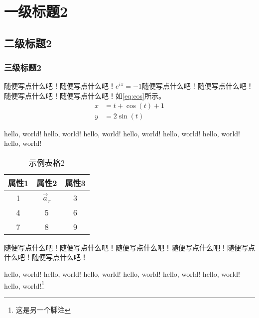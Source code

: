 \chapter{一级标题2}
\section{二级标题2}
\subsection{三级标题2}
随便写点什么吧！随便写点什么吧！$e^{i\pi}=-1$随便写点什么吧！随便写点什么吧！随便写点什么吧！随便写点什么吧！如\ref{eq:cos}所示。
\begin{align}
    x &=t+\cos(t)  + 1 \label{eq:cos}  \\
    y &=2\sin(t)
\end{align}


hello, world! hello, world! hello, world! hello, world! hello, world! hello, world! hello, world!

\begin{table}[htbp]
\caption{示例表格2} %
\centering
    \begin{tabular}{ccc} 
    \toprule
    \textbf{属性1} & \textbf{属性2} & \textbf{属性3} \\ \midrule
    1            & $\Vec{a}_r$  & 3            \\
    4            & 5            & 6            \\
    7            & 8            & 9            \\ \bottomrule
    \end{tabular}
\label{tab:exp_table2}

\end{table}

随便写点什么吧！随便写点什么吧！随便写点什么吧！随便写点什么吧！随便写点什么吧！随便写点什么吧！

hello, world! hello, world! hello, world! hello, world! hello, world! hello, world! hello, world!\footnote{这是另一个脚注}